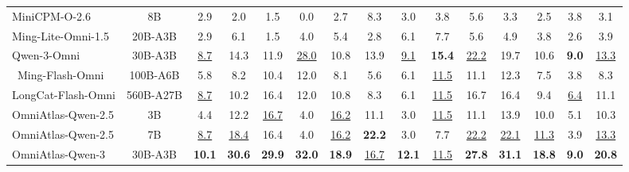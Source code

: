 \begin{table}[!t]
\begin{tabular}{l c ccccccccc ccc c}
MiniCPM-O-2.6
& 8B & 2.9 & 2.0 & 1.5 & 0.0 & 2.7 & 8.3 & 3.0 & 3.8 & 5.6 & 3.3 & 2.5 & 3.8 & 3.1 \\
Ming-Lite-Omni-1.5
& 20B-A3B & 2.9 & 6.1 & 1.5 & 4.0 & 5.4 & 2.8 & 6.1 & 7.7 & 5.6 & 4.9 & 3.8 & 2.6 & 3.9 \\
Qwen-3-Omni
& 30B-A3B & \underline{8.7} & 14.3 & 11.9 & \underline{28.0} & 10.8 & 13.9 & \underline{9.1} & {\bfseries 15.4} & \underline{22.2} & 19.7 & 10.6 & {\bfseries 9.0} & \underline{13.3} \\
~Ming-Flash-Omni
& 100B-A6B & 5.8 & 8.2 & 10.4 & 12.0 & 8.1 & 5.6 & 6.1 & \underline{11.5} & 11.1 & 12.3 & 7.5 & 3.8 & 8.3 \\
LongCat-Flash-Omni
& 560B-A27B & \underline{8.7} & 10.2 & 16.4 & 12.0 & 10.8 & 8.3 & 6.1 & \underline{11.5} & 16.7 & 16.4 & 9.4 & \underline{6.4} & 11.1 \\
\hdashline
\rowcolor[HTML]{f0edff}
OmniAtlas-Qwen-2.5
& 3B & 4.4 & 12.2 & \underline{16.7} & 4.0 & \underline{16.2} & 11.1 & 3.0 & \underline{11.5} & 11.1 & 13.9 & 10.0 & 5.1 & 10.3 \\
\rowcolor[HTML]{f0edff}
OmniAtlas-Qwen-2.5
& 7B & \underline{8.7} & \underline{18.4} & 16.4 & 4.0 & \underline{16.2} & {\bfseries 22.2} & 3.0 & 7.7 & \underline{22.2} & \underline{22.1} & \underline{11.3} & 3.9 & \underline{13.3} \\
\rowcolor[HTML]{f0edff}OmniAtlas-Qwen-3
& 30B-A3B & {\bfseries 10.1} & {\bfseries 30.6} & {\bfseries 29.9} & {\bfseries 32.0}
& {\bfseries 18.9} & \underline{16.7} & {\bfseries 12.1} & \underline{11.5} & {\bfseries 27.8}
& {\bfseries 31.1} & {\bfseries 18.8} & {\bfseries 9.0} & {\bfseries 20.8} \\
\bottomrule
\end{tabular}
\end{table}

